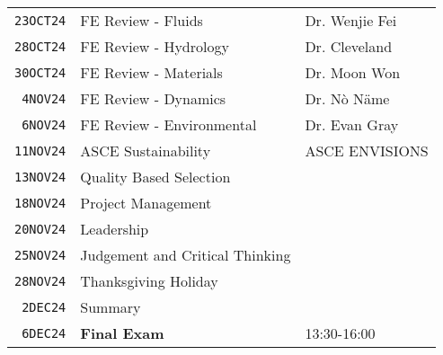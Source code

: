 \documentclass[12pt]{article}
\begin{document}
\begin{table}[ht!]
\begin{tabular}{p{0.5in}p{2.5in}p{4.0in}}
\texttt{23OCT24} & FE Review - Fluids & Dr. Wenjie Fei \cite{NCEES2020}  \cite{Lindeburg2017}\\ %
\texttt{28OCT24} & FE Review - Hydrology & Dr. Cleveland \cite{NCEES2020}  \cite{Lindeburg2017}\\ %
\texttt{30OCT24} & FE Review - Materials & Dr. Moon Won \cite{NCEES2020}  \cite{Lindeburg2017}\\ %
\texttt{~4NOV24} & FE Review - Dynamics & Dr. N\`o N\"ame \cite{NCEES2020}  \cite{Lindeburg2017}\\ %
\texttt{~6NOV24} & FE Review - Environmental  & Dr. Evan Gray \cite{NCEES2020}  \cite{Lindeburg2017}\\ %
\texttt{11NOV24} & ASCE Sustainability & ASCE ENVISIONS \\ %
\texttt{13NOV24} & Quality Based Selection &  \cite{TEPAQBS2021} \\ %
\texttt{18NOV24} & Project Management &  \cite{Lawson2022PM} \\ %
\texttt{20NOV24} & Leadership &  \\ %
\texttt{25NOV24} & Judgement and Critical Thinking & \cite{Critical2022} \\ %
\texttt{28NOV24} & Thanksgiving Holiday &    \\ %
\texttt{~2DEC24} & Summary & \\ %
\texttt{~6DEC24} & \textbf{Final Exam} & 13:30-16:00 \\ %
\hline
   \end{tabular}
   \label{tab:fall2013schedule}
\end{table}


\clearpage
\end{document}
